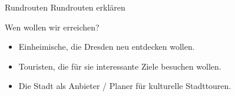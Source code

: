 \documentclass[13pt, usenames, dvipsnames]{beamer}
\begin{document}
\begin{frame}{Rundrouten}
    Rundrouten erklären
\end{frame}

\begin{frame}{Wen wollen wir erreichen?}
    \begin{itemize}
        \item Einheimische, die Dresden neu entdecken wollen.
        \item Touristen, die für sie interessante Ziele besuchen wollen.
        \item Die Stadt als Anbieter / Planer für kulturelle Stadttouren.
    \end{itemize}
\end{frame}

\begin{frame}{}
\end{frame}
\end{document}
